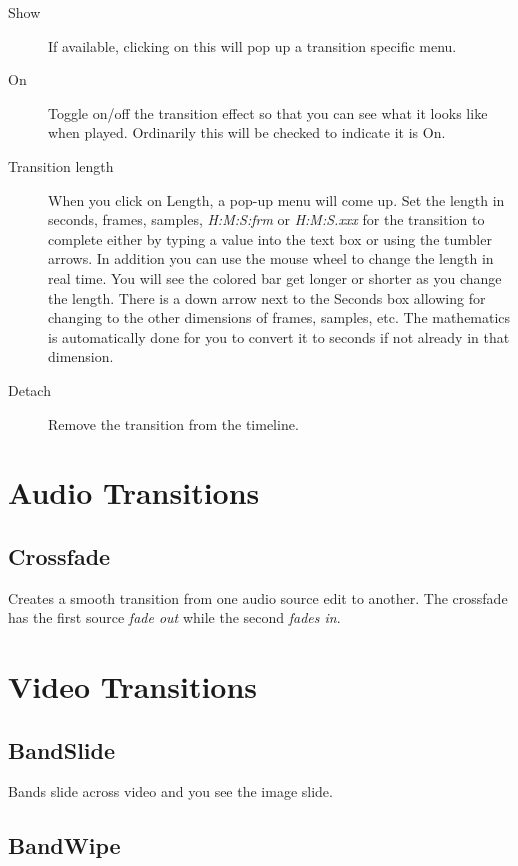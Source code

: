 \begin{description}
    \item[Show] If available, clicking on this will pop up a transition specific menu.
    \item[On] Toggle on/off the transition effect so that you can see what it looks like when played. Ordinarily this will be checked to indicate it is On.
    \item[Transition length] When you click on Length, a pop-up menu will come up.  Set the length in seconds, frames, samples, \textit{H:M:S:frm} or \textit{H:M:S.xxx} for the transition to complete either by typing a value into the text box or using the tumbler arrows.  In addition you can use the mouse wheel to change the length in real time. You will see the colored bar get longer or shorter as you change the length. 
There is a down arrow next to the Seconds box allowing for changing to the other dimensions of frames, samples, etc.  The mathematics is automatically done for you to convert it to seconds if not already in that dimension.
    \item[Detach] Remove the transition from the timeline.
\end{description}

\section{Audio Transitions}%
\label{sec:audio_transition}

\subsection*{Crossfade}%
\label{sub:crossfade}

Creates a smooth transition from one audio source edit to another. The crossfade has the first source \textit{fade out} while the second \textit{fades in}.

\section{Video Transitions}%
\label{sec:video_transition}

\subsection*{BandSlide}%
\label{sub:bandslide}

Bands slide across video and you see the image slide.

\subsection*{BandWipe}%
\label{sub:bandwipe}

